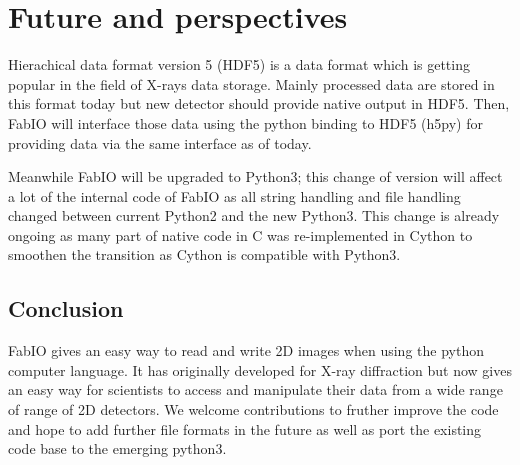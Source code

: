 \documentclass{iucr}
\begin{document}


\section{Future and perspectives}

Hierachical data format version 5 (HDF5\cite{hdf5}) is a data format which is
getting popular in the field of X-rays data storage. Mainly processed
data are stored in this format today but new detector should provide native
output in HDF5. Then, FabIO will interface those data using the python binding 
to HDF5 (h5py\cite{h5py}) for providing data via the same interface as of today.

Meanwhile FabIO will be upgraded to Python3; this change of version will affect
a lot of the internal code of FabIO as all string handling and file handling
changed between current Python2 and the new Python3. This change is already
ongoing as many part of native code in C was re-implemented in
Cython\cite{cython} to smoothen the transition as Cython is compatible with
Python3.

\subsection{Conclusion}

FabIO gives an easy way to read and write 2D images when using the
python computer language.
It has originally developed for X-ray diffraction but now gives
an easy way for scientists to access and manipulate
their data from a wide range of range of 2D detectors.
We welcome contributions to fruther improve the code and hope to add
further file formats in the future as well as port the existing code base to the emerging python3.
\end{document}
